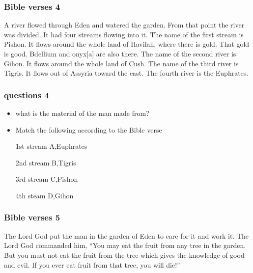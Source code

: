\documentclass{beamer}
\begin{document}
\begin{frame}
\frametitle{Bible verses 4}
A river flowed through Eden and watered the garden. From that point the river was divided. It had four streams flowing into it. The name of the first stream is Pishon. It flows around the whole land of Havilah, where there is gold. That gold is good. Bdellium and onyx[a] are also there. The name of the second river is Gihon. It flows around the whole land of Cush. The name of the third river is Tigris. It flows out of Assyria toward the east. The fourth river is the Euphrates.

\end{frame}


\begin{frame}
\frametitle{questions 4}
\begin{itemize}
\item what is the material of the man made from?

\item Match the following according to the Bible verse

1st stream \hspace{3cm} A,Euphrates    
  
2nd stream	\hspace{3cm} B,Tigris

3rd stream \hspace{3cm} C,Pishon

4th steam	\hspace{3cm} D,Gihon
\end{itemize}
\end{frame}


\begin{frame}
\frametitle{Bible verses 5}
The Lord God put the man in the garden of Eden to care for it and work it.  The Lord God commanded him, “You may eat the fruit from any tree in the garden. But you must not eat the fruit from the tree which gives the knowledge of good and evil. If you ever eat fruit from that tree, you will die!”
\end{frame}
\end{document}
